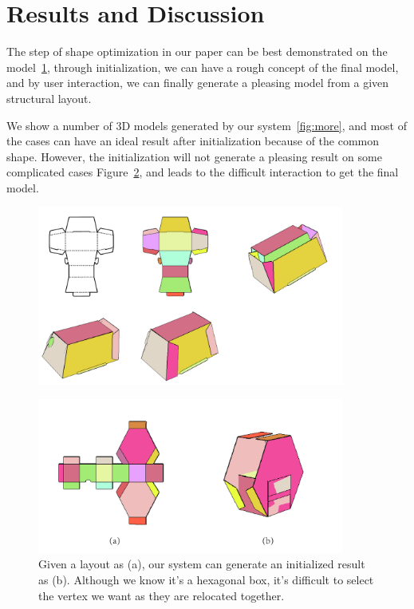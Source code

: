 \section{Results and Discussion}\label{sec:result}
{}

The step of shape optimization in our paper can be best demonstrated on the model~\ref{fig:result}, through initialization, we can have a rough concept of the final model, and by user interaction, we can finally generate a pleasing model from a given structural layout.

We show a number of 3D models generated by our system~\ref{fig:more}, and most of the cases can have an ideal result after initialization because of the common shape. However, the initialization will not generate a pleasing result on some complicated cases Figure~\ref{fig:limitation}, and leads to the difficult interaction to get the final model. 


\begin{figure}
	\centering
	\includegraphics[width=0.9\textwidth]{images/result.jpg}
	\caption{}
	\label{fig:result}
\end{figure}

\begin{figure}
	\centering
	\includegraphics[width=0.9\textwidth]{images/limitation.jpg}
	\caption{Given a layout as (a), our system can generate an initialized result as (b). Although we know it's a hexagonal box, it's difficult to select the vertex we want as they are relocated together.}
	\label{fig:limitation}
\end{figure}

